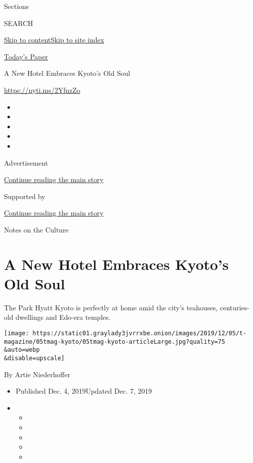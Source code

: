 Sections

SEARCH

\protect\hyperlink{site-content}{Skip to
content}\protect\hyperlink{site-index}{Skip to site index}

\href{https://myaccount.nytimes3xbfgragh.onion/auth/login?response_type=cookie\&client_id=vi}{}

\href{https://www.nytimes3xbfgragh.onion/section/todayspaper}{Today's
Paper}

A New Hotel Embraces Kyoto's Old Soul

\url{https://nyti.ms/2YfnzZo}

\begin{itemize}
\item
\item
\item
\item
\item
\end{itemize}

Advertisement

\protect\hyperlink{after-top}{Continue reading the main story}

Supported by

\protect\hyperlink{after-sponsor}{Continue reading the main story}

Notes on the Culture

\hypertarget{a-new-hotel-embraces-kyotos-old-soul}{%
\section{A New Hotel Embraces Kyoto's Old
Soul}\label{a-new-hotel-embraces-kyotos-old-soul}}

The Park Hyatt Kyoto is perfectly at home amid the city's teahouses,
centuries-old dwellings and Edo-era temples.

\texttt{[image: https://static01.graylady3jvrrxbe.onion/images/2019/12/05/t-magazine/05tmag-kyoto/05tmag-kyoto-articleLarge.jpg?quality=75\\\&auto=webp\\\&disable=upscale]}

By Artie Niederhoffer

\begin{itemize}
\item
  Published Dec. 4, 2019Updated Dec. 7, 2019
\item
  \begin{itemize}
  \item
  \item
  \item
  \item
  \item
  \end{itemize}
\end{itemize}

